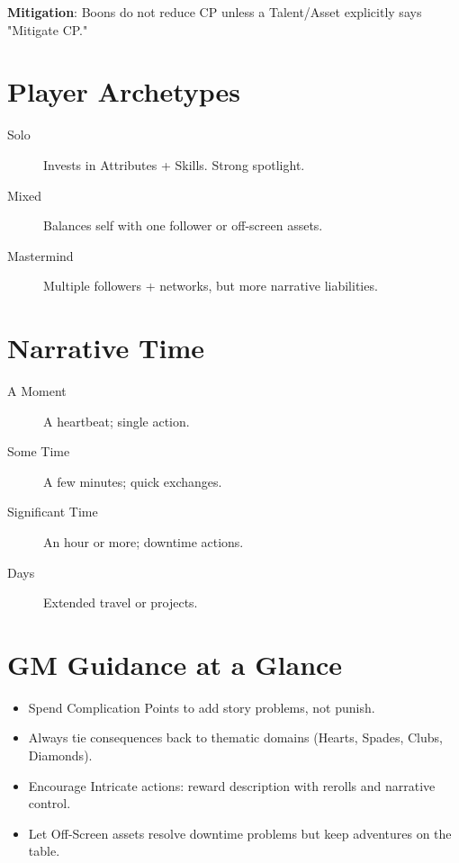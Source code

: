\textbf{Mitigation}: Boons do not reduce CP unless a Talent/Asset explicitly says "Mitigate CP."

\section{Player Archetypes}

\begin{description}
\item[Solo] Invests in Attributes + Skills. Strong spotlight.
\item[Mixed] Balances self with one follower or off-screen assets.
\item[Mastermind] Multiple followers + networks, but more narrative liabilities.
\end{description}

\section{Narrative Time}

\begin{description}
\item[A Moment] A heartbeat; single action.
\item[Some Time] A few minutes; quick exchanges.
\item[Significant Time] An hour or more; downtime actions.
\item[Days] Extended travel or projects.
\end{description}

\section{GM Guidance at a Glance}

\begin{itemize}
\item Spend Complication Points to add story problems, not punish.
\item Always tie consequences back to thematic domains (Hearts, Spades, Clubs, Diamonds).
\item Encourage Intricate actions: reward description with rerolls and narrative control.
\item Let Off-Screen assets resolve downtime problems but keep adventures on the table.
\end{itemize}

